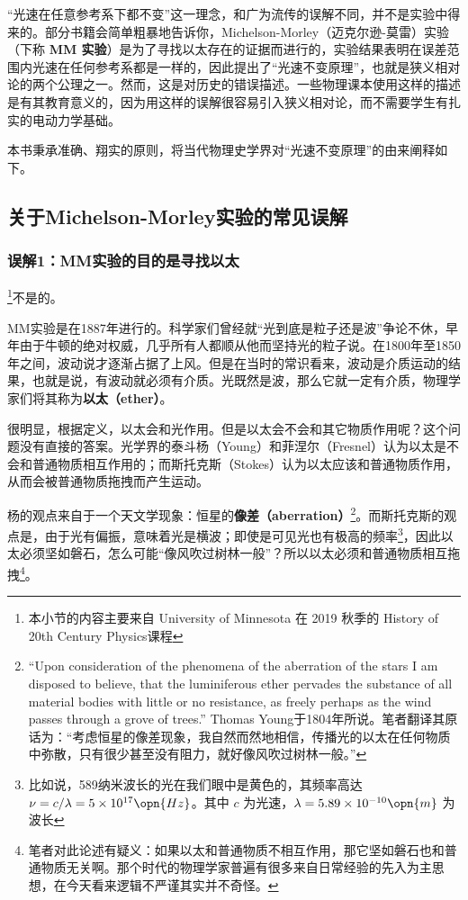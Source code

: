 

“光速在任意参考系下都不变”这一理念，和广为流传的误解不同，并不是实验中得来的。部分书籍会简单粗暴地告诉你，Michelson-Morley（迈克尔逊-莫雷）实验（下称 \textbf{MM 实验}）是为了寻找以太存在的证据而进行的，实验结果表明在误差范围内光速在任何参考系都是一样的，因此提出了“光速不变原理”，也就是狭义相对论的两个公理之一。然而，这是对历史的错误描述。一些物理课本使用这样的描述是有其教育意义的，因为用这样的误解很容易引入狭义相对论，而不需要学生有扎实的电动力学基础。

本书秉承准确、翔实的原则，将当代物理史学界对“光速不变原理”的由来阐释如下。

\subsection{关于Michelson-Morley实验的常见误解}

\subsubsection{误解1：MM实验的目的是寻找以太}

\footnote{本小节的内容主要来自 University of Minnesota 在 2019 秋季的 History of 20th Century Physics课程}不是的。

MM实验是在1887年进行的。科学家们曾经就“光到底是粒子还是波”争论不休，早年由于牛顿的绝对权威，几乎所有人都顺从他而坚持光的粒子说。在1800年至1850年之间，波动说才逐渐占据了上风。但是在当时的常识看来，波动是介质运动的结果，也就是说，有波动就必须有介质。光既然是波，那么它就一定有介质，物理学家们将其称为\textbf{以太（ether）}。

很明显，根据定义，以太会和光作用。但是以太会不会和其它物质作用呢？这个问题没有直接的答案。光学界的泰斗杨（Young）和菲涅尔（Fresnel）认为以太是不会和普通物质相互作用的；而斯托克斯（Stokes）认为以太应该和普通物质作用，从而会被普通物质拖拽而产生运动。

杨的观点来自于一个天文学现象：恒星的\textbf{像差（aberration）}\footnote{“Upon consideration of the phenomena
of the aberration of the stars I am disposed to believe, that the luminiferous ether pervades the substance of all material bodies with little or no resistance, as freely perhaps as the wind passes through a grove of trees.” Thomas Young于1804年所说。笔者翻译其原话为：“考虑恒星的像差现象，我自然而然地相信，传播光的以太在任何物质中弥散，只有很少甚至没有阻力，就好像风吹过树林一般。”}。而斯托克斯的观点是，由于光有偏振，意味着光是横波；即使是可见光也有极高的频率\footnote{比如说，589纳米波长的光在我们眼中是黄色的，其频率高达 $\nu=c/\lambda=5\times10^{17}\opn{Hz}$。其中 $c$ 为光速，$\lambda=5.89\times10^{-10}\opn{m}$ 为波长}，因此以太必须坚如磐石，怎么可能“像风吹过树林一般”？所以以太必须和普通物质相互拖拽\footnote{笔者对此论述有疑义：如果以太和普通物质不相互作用，那它坚如磐石也和普通物质无关啊。那个时代的物理学家普遍有很多来自日常经验的先入为主思想，在今天看来逻辑不严谨其实并不奇怪。}。%

